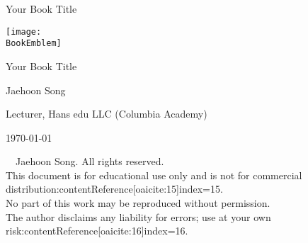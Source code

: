 \documentclass[11pt,oneside]{book} %
\newcommand{\BookTitle}{Your Book Title}
\newcommand{\BookAuthor}{Jaehoon Song}
\newcommand{\BookInstitution}{Hans edu LLC (Columbia Academy)}
\newcommand{\BookEmblem}{./images/emblem.png} %
\begin{document}
\frontmatter

\begin{titlepage}
  \thispagestyle{empty}
  \vspace*{7cm} %
  \begin{center}
    {\Huge \BookTitle \par}
  \end{center}
\end{titlepage}

\cleardoublepage
\thispagestyle{empty}
\begin{titlepage}
  \begin{center}
    \texttt{[image: \\BookEmblem]}\par\vspace{1cm}
    {\LARGE \BookTitle \par}
    \vspace{0.5cm}
    \vspace{1cm}
    {\Large \BookAuthor \par}
    {\normalsize Lecturer, \BookInstitution \par}
    \vfill
    {\normalsize \today \par} %
  \end{center}
\end{titlepage}

\cleardoublepage
\thispagestyle{empty}
\begin{center}
  {\small \textcopyright\ \the\year\ \BookAuthor. All rights reserved.}\\
  {\small This document is for educational use only and is not for commercial distribution:contentReference[oaicite:15]{index=15}.}\\
  {\small No part of this work may be reproduced without permission.}\\
  {\small The author disclaims any liability for errors; use at your own risk:contentReference[oaicite:16]{index=16}.}\\
\end{center}

\cleardoublepage
\thispagestyle{empty}
\end{document}
